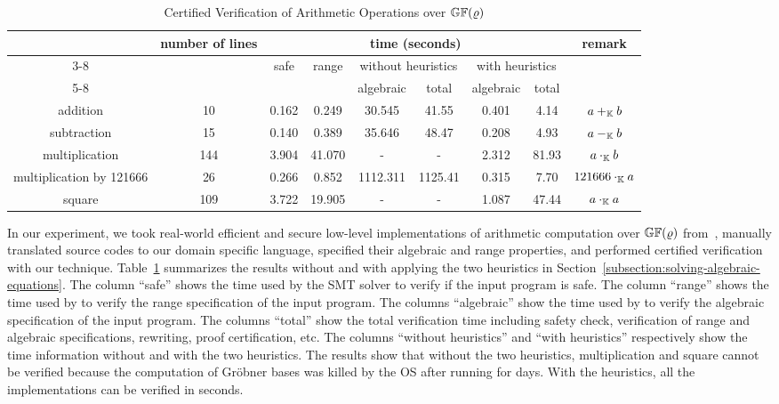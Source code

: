 \begin{table*}
  \caption{Certified Verification of Arithmetic Operations over
    $\mathbb{GF}(\varrho)$}
  \centering
  \begin{tabular}{|c|c|c|c|c|c|c|c|c|}
    \hline
    \multirow{3}{*}{} & \multirow{3}{*}{number of lines} & \multicolumn{6}{|c|}{time (seconds)} & \multirow{3}{*}{remark} \\ \cline{3-8}
    & & \multirow{2}{*}{safe} & \multirow{2}{*}{range} & \multicolumn{2}{|c|}{without heuristics} & \multicolumn{2}{|c|}{with heuristics} & \\ \cline{5-8}
    & & & & algebraic & total & algebraic & total & \\
    \hline
    addition                 & 10  & 0.162 & 0.249 & 30.545 & 41.55 & 0.401 & 4.14 & $a +_{\mathbb{K}} b$ \\
    \hline
    subtraction              & 15  & 0.140 & 0.389 & 35.646 & 48.47 & 0.208 & 4.93 & $a -_{\mathbb{K}} b$ \\
    \hline
    multiplication           & 144 & 3.904 & 41.070 & - & - & 2.312 & 81.93 & $a \cdot_{\mathbb{K}} b$\\
    \hline
    multiplication by 121666 & 26  & 0.266 & 0.852 & 1112.311 & 1125.41 & 0.315 & 7.70 & $121666 \cdot_{\mathbb{K}} a$\\
    \hline
    square                   & 109 & 3.722 & 19.905  & - & - & 1.087 & 47.44 & $a \cdot_{\mathbb{K}} a$\\
    \hline
  \end{tabular}
  \label{table:arithmetic-operations}
\end{table*}

In our experiment, we took real-world efficient and secure
low-level implementations of arithmetic computation over
$\mathbb{GF}(\varrho)$ from~\cite{BDL+:11:HSHSS,BDL+:12:HSHSS},
manually translated source
codes to our domain specific language, specified their algebraic and range
properties, and performed certified verification with our technique.
Table~\ref{table:arithmetic-operations} summarizes the results
without and with applying the two heuristics in Section~\ref{subsection:solving-algebraic-equations}.
The column ``safe'' shows the time used by the SMT solver \boolector to verify if the input program is safe.
The column ``range'' shows the time used by \boolector to verify the range specification of the input program.
The columns ``algebraic'' show the time used by \singular to verify the algebraic specification of the input program.
The columns ``total'' show the total verification time including safety check, verification of range and algebraic specifications, rewriting, proof certification, etc.
The columns ``without heuristics'' and ``with heuristics'' respectively show the time information without and with the two heuristics.
The results show that without the two heuristics, multiplication and square
cannot be verified because the computation of Gr\"obner bases was killed by the OS
after running for days.
With the heuristics, all the implementations can be verified in seconds.

